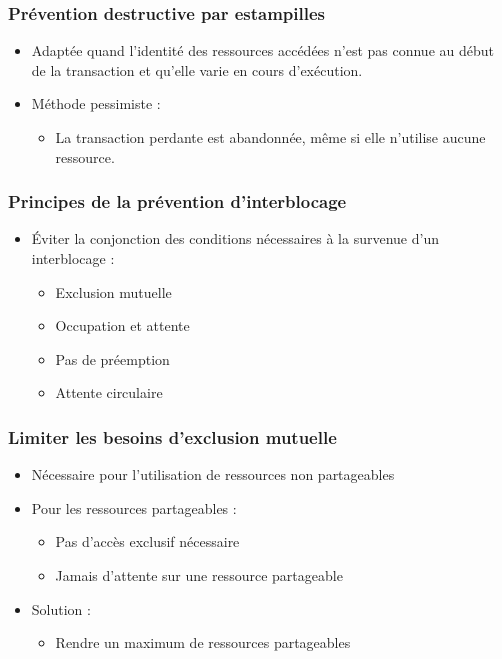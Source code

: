 \begin{frame}
\frametitle{Prévention destructive par estampilles}
\begin{itemize}
\item Adaptée quand l'identité des ressources accédées n'est pas connue au début de la transaction et qu'elle varie en cours d’exécution.
\item Méthode pessimiste :
\begin{itemize}
\item La transaction perdante est abandonnée, même si elle n'utilise aucune ressource.
\end{itemize}
\end{itemize}
\end{frame}

\begin{frame}
\frametitle{Principes de la prévention d’interblocage}
\begin{itemize}
\item Éviter la conjonction des conditions nécessaires à la survenue d’un interblocage :
\begin{itemize}
\item Exclusion mutuelle
\item Occupation et attente
\item Pas de préemption
\item Attente circulaire
\end{itemize}
\end{itemize}
\end{frame}

\begin{frame}
\frametitle{Limiter les besoins d’exclusion mutuelle}
\begin{itemize}
\item Nécessaire pour l’utilisation de ressources non partageables
\item Pour les ressources partageables :
\begin{itemize}
\item Pas d’accès exclusif nécessaire
\item Jamais d’attente sur une ressource partageable
\end{itemize}
\item Solution :
\begin{itemize}
\item Rendre un maximum de ressources partageables
\end{itemize}
\end{itemize}
\end{frame}

